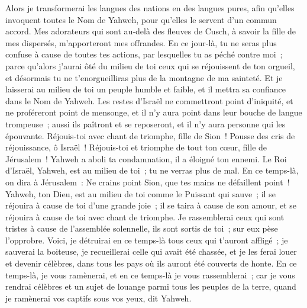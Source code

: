 \begin{multicols}{2}
Alors je transformerai les langues des nations en des langues pures, afin qu'elles invoquent toutes le Nom de Yahweh, pour qu'elles le servent d'un commun accord.
Mes adorateurs qui sont au-delà des fleuves de Cusch, à savoir la fille de mes dispersés, m'apporteront mes offrandes.
En ce jour-là, tu ne seras plus confuse à cause de toutes tes actions, par lesquelles tu as péché contre moi~; parce qu'alors j'aurai ôté du milieu de toi ceux qui se réjouissent de ton orgueil, et désormais tu ne t'enorgueilliras plus de la montagne de ma sainteté.
Et je laisserai au milieu de toi un peuple humble et faible, et il mettra sa confiance dans le Nom de Yahweh.
Les restes d'Israël ne commettront point d'iniquité, et ne proféreront point de mensonge, et il n'y aura point dans leur bouche de langue trompeuse~; aussi ils paîtront et se reposeront, et il n'y aura personne qui les épouvante.
Réjouis-toi avec chant de triomphe, fille de Sion~! Pousse des cris de réjouissance, ô Israël~! Réjouis-toi et triomphe de tout ton cœur, fille de Jérusalem~!
Yahweh a aboli ta condamnation, il a éloigné ton ennemi. Le Roi d'Israël, Yahweh, est au milieu de toi~; tu ne verras plus de mal.
En ce temps-là, on dira à Jérusalem~: Ne crains point Sion, que tes mains ne défaillent point~!
Yahweh, ton Dieu, est au milieu de toi comme le Puissant qui sauve~; il se réjouira à cause de toi d'une grande joie~; il se taira à cause de son amour, et se réjouira à cause de toi avec chant de triomphe.
Je rassemblerai ceux qui sont tristes à cause de l'assemblée solennelle, ils sont sortis de toi~; sur eux pèse l'opprobre.
Voici, je détruirai en ce temps-là tous ceux qui t'auront affligé~; je sauverai la boiteuse, je recueillerai celle qui avait été chassée, et je les ferai louer et devenir célèbres, dans tous les pays où ils auront été couverts de honte.
En ce temps-là, je vous ramènerai, et en ce temps-là je vous rassemblerai~; car je vous rendrai célèbres et un sujet de louange parmi tous les peuples de la terre, quand je ramènerai vos captifs sous vos yeux, dit Yahweh.
\PPE{}
\end{multicols}
